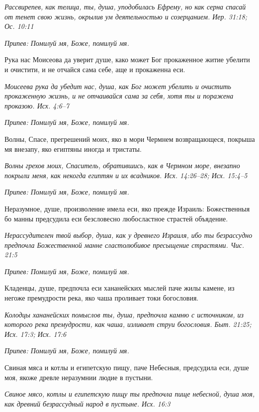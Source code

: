 \itshape Рассвирепев, как телица, ты, душа, уподобилась Ефрему, но как серна спасай от тенет свою жизнь, окрылив ум деятельностью и созерцанием. Иер. 31:18; Ос. 10:11\normalfont{}


\itshape Припев:\normalfont{} Помилуй мя, Боже, помилуй мя.


Рука нас Моисеова да уверит душе, како может Бог прокаженное житие убелити и очистити, и не отчайся сама себе, аще и прокаженна еси.


\itshape Моисеева рука да убедит нас, душа, как Бог может убелить и очистить прокаженную жизнь, и не отчаивайся сама за себя, хотя ты и поражена проказою. Исх. 4:6–7\normalfont{}


\itshape Припев:\normalfont{} Помилуй мя, Боже, помилуй мя.


Волны, Спасе, прегрешений моих, яко в мори Чермнем возвращающеся, покрыша мя внезапу, яко египтяны иногда и тристаты.


\itshape Волны грехов моих, Спаситель, обратившись, как в Чермном море, внезапно покрыли меня, как некогда египтян и их всадников. Исх. 14:26–28; Исх. 15:4–5\normalfont{}


\itshape Припев:\normalfont{} Помилуй мя, Боже, помилуй мя.


Неразумное, душе, произволение имела еси, яко прежде Израиль: Божественныя бо манны предсудила еси безсловесно любосластное страстей объядение.


\itshape Нерассудителен твой выбор, душа, как у древнего Израиля, ибо ты безрассудно предпочла Божественной манне сластолюбивое пресыщение страстями. Чис. 21:5\normalfont{}


\itshape Припев:\normalfont{} Помилуй мя, Боже, помилуй мя.


Кладенцы, душе, предпочла еси хананейских мыслей паче жилы камене, из негоже премудрости река, яко чаша проливает токи богословия.


\itshape Колодцы хананейских помыслов ты, душа, предпочла камню с источником, из которого река премудрости, как чаша, изливает струи богословия. Быт. 21:25; Исх. 17:3; Исх. 17:6\normalfont{}


\itshape Припев:\normalfont{} Помилуй мя, Боже, помилуй мя.


Свиная мяса и котлы и египетскую пищу, паче Небесныя, предсудила еси, душе моя, якоже древле неразумнии людие в пустыни.


\itshape Свиное мясо, котлы и египетскую пищу ты предпочла пище небесной, душа моя, как древний безрассудный народ в пустыне. Исх. 16:3\normalfont{}


